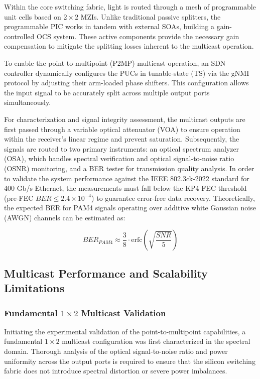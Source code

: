 Within the core switching fabric, light is routed through a mesh of programmable unit cells based 
on $2\times2$ MZIs. Unlike traditional passive splitters, the programmable PIC works in tandem
with external SOAs, building a gain-controlled OCS system. These active components provide 
the necessary gain compensation to mitigate the splitting losses inherent to the multicast 
operation. 

To enable the point-to-multipoint (P2MP) multicast operation, an SDN controller dynamically 
configures the PUCs in tunable-state (TS) via the gNMI protocol by adjusting their arm-loaded phase 
shifters. This configuration allows the input signal to be accurately split across multiple output 
ports simultaneously.

For characterization and signal integrity assessment, the multicast outputs are first passed 
through a variable optical attenuator (VOA) to ensure operation within the receiver's linear 
regime and prevent saturation. Subsequently, the signals are routed to two primary instruments: 
an optical spectrum analyzer (OSA), which handles spectral verification and optical 
signal-to-noise ratio (OSNR) monitoring, and a BER tester for transmission quality analysis.
In order to validate the system performance against the IEEE 802.3ck-2022 standard for 400 Gb/s 
Ethernet, the measurements must fall below the KP4 FEC threshold (pre-FEC 
$BER \le 2.4 \times 10^{-4}$) to guarantee error-free data recovery. Theoretically, the expected 
BER for PAM4 signals operating over additive white Gaussian noise (AWGN) channels can be estimated 
as:

\begin{equation}
    BER_{PAM4} \approx \frac{3}{8} \cdot \text{erfc}\left(\sqrt{\frac{SNR}{5}}\right)
\end{equation}


\subsection{Multicast Performance and Scalability Limitations}
\label{subsec:multicast_results}

\subsubsection{Fundamental $1\times2$ Multicast Validation}

Initiating the experimental validation of the point-to-multipoint capabilities, a fundamental 
$1\times2$ multicast configuration was first characterized in the spectral domain. Thorough 
analysis of the optical signal-to-noise ratio and power uniformity across the output ports is 
required to ensure that the silicon switching fabric does not introduce spectral distortion or 
severe power imbalances.

